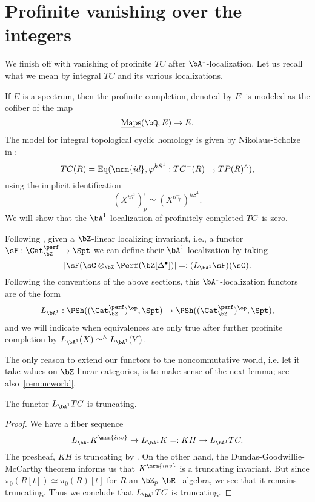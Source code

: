 \documentclass[a4paper,10pt]{amsart}
\begin{document}
\section{Profinite vanishing over the integers} We finish off with vanishing of profinite $TC$ after $\bA^1$-localization. Let us recall what we mean by integral $TC$ and its various localizations.

\sssec{} If $E$ is a spectrum, then the profinite completion, denoted by $E^{\comp}$ is modeled as the cofiber of the map
\[
\underline{\Maps}(\bQ, E) \rightarrow E.
\]
The model for integral topological cyclic homology is given by Nikolaus-Scholze in \cite[Section II.1]{nikolaus-scholze}:
\begin{equation} \label{eq:tc-z}
TC(R) = \mathrm{Eq}(\mrm{id}, \phi^{hS^1}:TC^-(R) \rightrightarrows TP(R)^{\comp}),
\end{equation}
using the implicit identification \cite[Lemma II.4.2]{nikolaus-scholze}
\[
(X^{tS^1})^\comp_p \simeq (X^{tC_p})^{hS^1}.
\]
We will show that the $\bA^1$-localization of profinitely-completed $TC^{\comp}$ is zero.



\sssec{} Following \cite[Definition 3.13]{LT}, given a $\bZ$-linear localizing invariant, i.e., a functor $\sF:\Cat^{\perf}_{\bZ}\rightarrow \Spt$ we can define their ${\bA^1}$-localization by taking 
\[
|\sF(\sC \otimes_{\bZ} \Perf(\bZ[\Delta^{\bullet}])| =:(L_{\bA^1}\sF)(\sC).
\]
Following the conventions of the above sections, this ${\bA^1}$-localization functors are of the form
\[
L_{\bA^1}: \PSh((\Cat^{\perf}_{\bZ})^{\op},\Spt) \rightarrow \PSh((\Cat^{\perf}_{\bZ})^{\op},\Spt),
\]
and we will indicate when equivalences are only true after further profinite completion by $L_{\bA^1}(X) \simeq^{\comp} L_{\bA^1}(Y)$.


\sssec{} The only reason to extend our functors to the noncommutative world, i.e. let it take values on $\bZ$-linear categories, is to make sense of the next lemma; see also~\ref{rem:ncworld}.


\begin{lem}\label{thm:tc} The functor $L_{\bA^1}TC$ is truncating.

\end{lem}

\begin{proof} We have a fiber sequence
\[
L_{\bA^1}K^{\mrm{inv}} \rightarrow L_{\bA^1}K=:KH \rightarrow L_{\bA^1}TC.
\]
The presheaf, $KH$ is truncating by \cite[Proposition 3.14]{LT}. On the other hand, the Dundas-Goodwillie-McCarthy theorem informs us that $K^{\mrm{inv}}$ is a truncating invariant. But since $\pi_0(R[t]) \simeq \pi_0(R)[t]$ for $R$ an $\bZ_p$-$\bE_1$-algebra, we see that it remains truncating. Thus we conclude that $L_{\bA^1}TC$ is truncating.
\end{proof}
\end{document}
